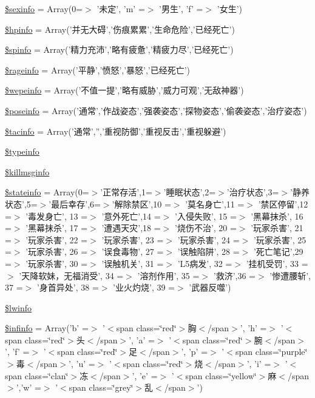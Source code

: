 \begin{DoxyCompactItemize}
\item 
\hyperlink{cache_2resources__1_8php_a7fc213b5009edd4913f9a3f66776c721}{\$sexinfo} = Array(0=$>$ '未定', 'm' =$>$ '男生', 'f' =$>$ '女生')
\item 
\hyperlink{cache_2resources__1_8php_a6f91f38ee66d31d99255d9dc86032980}{\$hpinfo} = Array('并无大碍','伤痕累累','生命危险','已经死亡')
\item 
\hyperlink{cache_2resources__1_8php_a79b3890cc1a3fac35858fb155b285743}{\$spinfo} = Array('精力充沛','略有疲惫','精疲力尽','已经死亡')
\item 
\hyperlink{cache_2resources__1_8php_a5f383706ecfe4033fc5ba410b5efe3a0}{\$rageinfo} = Array('平静','愤怒','暴怒','已经死亡')
\item 
\hyperlink{cache_2resources__1_8php_a24d2c967a140f9ff99ba082c9353f696}{\$wepeinfo} = Array('不值一提','略有威胁','威力可观','无敌神器')
\item 
\hyperlink{cache_2resources__1_8php_af6cbbc5cff2f1db3093587d7495600ae}{\$poseinfo} = Array('通常','作战姿态','强袭姿态','探物姿态','偷袭姿态','治疗姿态')
\item 
\hyperlink{cache_2resources__1_8php_aed45c4ff2bc7ce0af6c4b05414cd1373}{\$tacinfo} = Array('通常','','重视防御','重视反击','重视躲避')
\item 
\hyperlink{cache_2resources__1_8php_afeaf726d0642146d7bf10c04e2c99075}{\$typeinfo}
\item 
\hyperlink{cache_2resources__1_8php_acfdab9efcdacf2869477a5e833712b40}{\$killmsginfo}
\item 
\hyperlink{cache_2resources__1_8php_a014f40ed69f3ce2bd7a3263f5b5c9d91}{\$stateinfo} = Array(0=$>$'正常存活',1=$>$'睡眠状态',2=$>$'治疗状态',3=$>$'静养状态',5=$>$'最后幸存',6=$>$'解除禁区',10 =$>$ '莫名身亡',11 =$>$ '禁区停留',12 =$>$ '毒发身亡', 13 =$>$ '意外死亡',14 =$>$ '入侵失败', 15 =$>$ '黑幕抹杀', 16 =$>$ '黑幕抹杀', 17 =$>$ '遭遇天灾',18 =$>$ '烧伤不治', 20 =$>$ '玩家杀害', 21 =$>$ '玩家杀害', 22 =$>$ '玩家杀害', 23 =$>$ '玩家杀害', 24 =$>$ '玩家杀害', 25 =$>$ '玩家杀害', 26 =$>$ '误食毒物', 27 =$>$ '误触陷阱', 28 =$>$ '死亡笔记',29 =$>$ '玩家杀害', 30 =$>$ '误触机关', 31 =$>$ 'L5病发', 32 =$>$ '挂机受罚', 33 =$>$ '天降软妹，无福消受', 34 =$>$ '溶剂作用', 35 =$>$ '救济',36 =$>$ '惨遭腰斩', 37 =$>$ '身首异处', 38 =$>$ '业火灼烧', 39 =$>$ '武器反噬')
\item 
\hyperlink{cache_2resources__1_8php_a8bc9ffb8d571d6f8b62846c5ba0b9749}{\$lwinfo}
\item 
\hyperlink{cache_2resources__1_8php_a33e1d274ac0cd7ca76b5cc43833f5c1f}{\$infinfo} = Array('b' =$>$ '$<$span class=\char`\"{}red\char`\"{}$>$胸$<$/span$>$', 'h' =$>$ '$<$span class=\char`\"{}red\char`\"{}$>$头$<$/span$>$', 'a' =$>$ '$<$span class=\char`\"{}red\char`\"{}$>$腕$<$/span$>$', 'f' =$>$ '$<$span class=\char`\"{}red\char`\"{}$>$足$<$/span$>$', 'p' =$>$ '$<$span class=\char`\"{}purple\char`\"{}$>$毒$<$/span$>$', 'u' =$>$ '$<$span class=\char`\"{}red\char`\"{}$>$烧$<$/span$>$', 'i' =$>$ '$<$span class=\char`\"{}clan\char`\"{}$>$冻$<$/span$>$', 'e' =$>$ '$<$span class=\char`\"{}yellow\char`\"{}$>$麻$<$/span$>$','w' =$>$ '$<$span class=\char`\"{}grey\char`\"{}$>$乱$<$/span$>$')

\end{DoxyCompactItemize}
